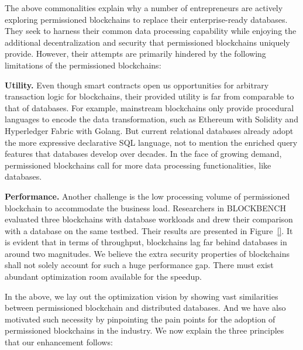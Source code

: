 The above commonalities explain why a number of entrepreneurs are actively exploring permissioned blockchains to replace their enterprise-ready databases. 
They seek to harness their common data processing capability while enjoying the additional decentralization and security that permissioned blockchains uniquely provide. 
However, their attempts are primarily hindered by the following limitations of the permissioned blockchains:

\textbf{Utility. }
Even though smart contracts open us opportunities for arbitrary transaction logic for blockchains, their provided utility is far from comparable to that of databases. 
For example, mainstream blockchains only provide procedural languages to encode the data transformation, such as Ethereum with Solidity and Hyperledger Fabric with Golang. 
But current relational databases already adopt the more expressive declarative SQL language, not to mention the enriched query features that databases develop over decades. 
In the face of growing demand, permissioned blockchains call for more data processing functionalities, like databases. 

\textbf{Performance. }
Another challenge is the low processing volume of permissioned blockchain to accommodate the business load. 
Researchers in BLOCKBENCH evaluated three blockchains with database workloads and drew their comparison with a database on the same testbed. 
Their results are presented in Figure~\ref{}. 
It is evident that in terms of throughput, blockchains lag far behind databases in around two magnitudes. 
We believe the extra security properties of blockchains shall not solely account for such a huge performance gap. 
There must exist abundant optimization room available for the speedup. 

In the above, we lay out the optimization vision by showing vast similarities between permissioned blockchain and distributed databases. 
And we have also motivated such necessity by pinpointing the pain points for the adoption of permissioned blockchains in the industry. 
We now explain the three principles that our enhancement follows:

